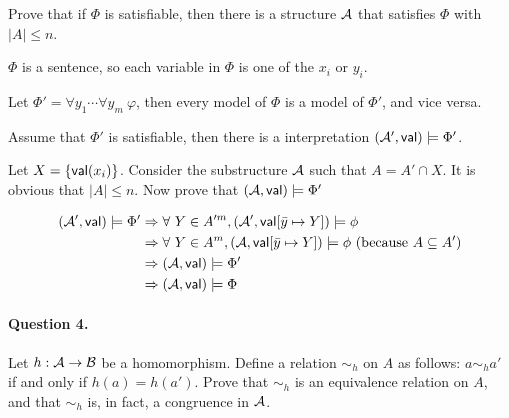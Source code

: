 \documentclass[11pt, a4paper]{article}
\begin{document}
Prove that if $\Phi$ is satisfiable, then there is a structure $\mathcal{A}$ that satisfies $\Phi$ with $|A|\leq n$. 
\begin{framed}
\solution

$\Phi$ is a sentence, so each variable in $\Phi$ is one of the $x_i$ or $y_i$.

Let $\Phi'= \forall y_1 \cdots \forall y_m \ \varphi$, then every model of $\Phi$ is a model of $\Phi'$, and vice versa.

Assume that $\Phi'$ is satisfiable, then there is a interpretation $(\mathcal{A}', \textsf{val})\models\Phi'$.

Let $X=\{\textsf{val}(x_i)\}$. Consider the substructure $\mathcal{A}$ such that $A=A'\cap X$. It is obvious that $|A|\leq n$. Now prove that $(\mathcal{A}, \textsf{val})\models \Phi'$

\begin{align*}
(\mathcal{A}', \textsf{val}) \models \Phi' &\Rightarrow \forall\ Y\in A'^{m}, (\mathcal{A}', \textsf{val}[\bar{y}\mapsto Y])\models \phi\\
                           &\Rightarrow \forall\ Y\in A^{m}, (\mathcal{A}, \textsf{val}[\bar{y}\mapsto Y])\models \phi \text{ (because $A\subseteq A'$)}\\
                           &\Rightarrow (\mathcal{A}, \textsf{val}) \models \Phi'\\
                           &\Rightarrow (\mathcal{A}, \textsf{val}) \models \Phi
\end{align*}
\end{framed}


\paragraph*{Question 4.}
Let $h:\mathcal{A} \to \mathcal{B}$ be a homomorphism.
Define a relation $\sim_h$ on $A$ as follows:
$a \sim_h a'$ if and only if $h(a)=h(a')$.
Prove that $\sim_h$ is an equivalence relation on $A$,
and that $\sim_h$ is, in fact, a congruence in $\mathcal{A}$.
\end{document}
